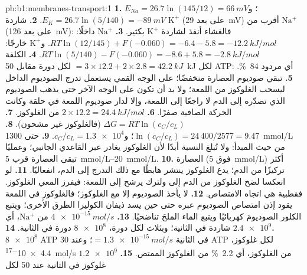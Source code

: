 \begin{solution}{pb:b1:membranes-transport:1}
\textbf{1.} $E_{Na} = 26.7\ln(145/12) = \qty{+66}{mV}$؛
و$E_K =
26.7\ln(5/140) = \qty{-89}{mV}$.
\textbf{2.} شاردة $\mathrm{K^+}$ (على بعد \qty{29}{mV}) أقرب من
$\mathrm{Na^+}$ (على بعد \qty{126}{mV}): فالغشاء أنفذ لشاردة
$\mathrm{K^+}$ بكثير.
\textbf{3.} $\mathrm{Na^+}$ داخلًا:
$RT\ln(12/145) + F(-0.060) = -6.4 -
5.8 = \qty{-12.2}{kJ/mol}$.
و$\mathrm{K^+}$ خارجًا:
$RT\ln(5/140) -
F(-0.060) = -8.6 + 5.8 = \qty{-2.8}{kJ/mol}$.
\textbf{4.} الكلفة $= 3\times 12.2 + 2\times 2.8 = \qty{42.2}{kJ}$
لكل دورة مقابل \qty{50}{kJ} لكل ATP: أي مردود \qty{84}{\%}.
\textbf{5.}  تبقي صوديوم العصارة منخفضًا؛  على
الوجه القمي يستعمل تدرج الصوديوم الداخل ليسحب الغلوكوز من اللمعة؛
ولا بد أن تكون  على الوجه الآخر حتى يذهب الصوديوم الذي تصدّره
إلى الدم لا راجعًا إلى اللمعة، وإلا لدار صوديوم اللمعة في حلقة وكانت
الحركة الصافية صفرًا.
\textbf{6.} $2\times 12.2 = \qty{24.4}{kJ/mol}$ من الغلوكوز.
\textbf{7.} $\Delta G = RT\ln(c_C/c_L)$ (فالغلوكوز غير مشحون).
\textbf{8.} $\ln(c_C/c_L) = 24\,400/2577 = 9.47$؛
و$c_C/c_L =
\num{1.3e4}$.
\textbf{9.} حتى \qty{1300}{mmol/L} من حيث المبدأ: ولا تُبلغ النسبة
أبدًا لأن الغلوكوز يغادر عبر  القاعدي الجانبي؛ وعمليًا تبقى
العصارة قرب \qtyrange{5}{20}{mmol/L}.
\textbf{10.} العصارة (فوق \qty{5}{mmol/L}) أكثر تركيزًا من الدم؛
 يدع الغلوكوز ينتشر هابطًا مع ذلك التدرج إلى الدم، انفعاليًا.
\textbf{11.} لو انعكسا لضخ  الغلوكوز من الدم إلى
 ولترك  يرشح إلى اللمعة: فيفرز المعي الغلوكوز. فقطبية
 هي اتجاه الامتصاص.
\textbf{12.}  لا يأخذ الصوديوم إلا مع الغلوكوز؛
فالغلوكوز في اللمعة يقود إذن امتصاص الصوديوم عبره حتى حين يسد ذيفان
الكوليرا الطرق الأخرى؛ ويتبع الكلور الصوديومَ كهربائيًا ويتبع الماء
الملحَ تناضحيًا.
\textbf{13.} $\qty{4e-15}{mol/s}$ من $\mathrm{Na^+}$، أي
$\num{2.4e9}$ شاردة في الثانية؛ وبثلاث لكل دورة، $\num{8e8}$ دورة في
الثانية.
\textbf{14.} $\num{8e8}$ ATP في الثانية $= \qty{1.3e-15}{mol/s}$؛
وعند 30 ATP لكل غلوكوز، \qty{4.4e-17}{mol/s} من الغلوكوز، أي
\qty{2.2}{\%} من الغلوكوز الممتص.
\textbf{15.} $\num{1.2e9}$ غلوكوز في الثانية عند 50 لكل 
\end{solution}
